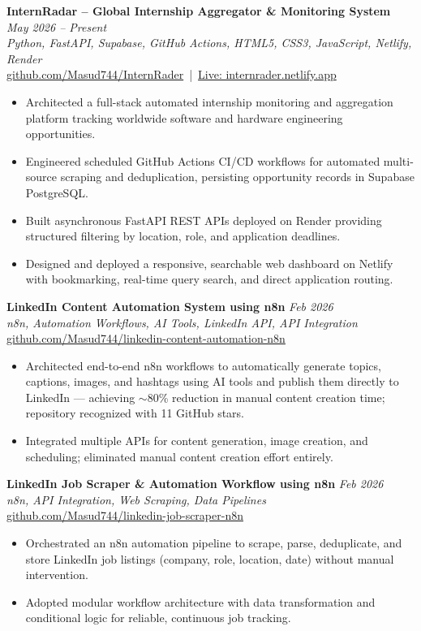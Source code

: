 \documentclass[11pt,a4paper]{article}
\begin{document}
\textbf{InternRadar -- Global Internship Aggregator \& Monitoring System} \hfill \textit{May 2026 -- Present} \\
\textit{Python, FastAPI, Supabase, GitHub Actions, HTML5, CSS3, JavaScript, Netlify, Render} \\
\href{https://github.com/Masud744/InternRader}{github.com/Masud744/InternRader} \,|\, \href{https://internrader.netlify.app/}{Live: internrader.netlify.app}
\begin{itemize}
    \item Architected a full-stack automated internship monitoring and aggregation platform tracking worldwide software and hardware engineering opportunities.
    \item Engineered scheduled GitHub Actions CI/CD workflows for automated multi-source scraping and deduplication, persisting opportunity records in Supabase PostgreSQL.
    \item Built asynchronous FastAPI REST APIs deployed on Render providing structured filtering by location, role, and application deadlines.
    \item Designed and deployed a responsive, searchable web dashboard on Netlify with bookmarking, real-time query search, and direct application routing.
\end{itemize}


\textbf{LinkedIn Content Automation System using n8n} \hfill \textit{Feb 2026} \\
\textit{n8n, Automation Workflows, AI Tools, LinkedIn API, API Integration} \\
\href{https://github.com/Masud744/linkedin-content-automation-n8n}{github.com/Masud744/linkedin-content-automation-n8n}
\begin{itemize}
    \item Architected end-to-end n8n workflows to automatically generate topics, captions, images, and hashtags using AI tools and publish them directly to LinkedIn --- achieving $\sim$80\% reduction in manual content creation time; repository recognized with 11 GitHub stars.
    \item Integrated multiple APIs for content generation, image creation, and scheduling; eliminated manual content creation effort entirely.
\end{itemize}

\textbf{LinkedIn Job Scraper \& Automation Workflow using n8n} \hfill \textit{Feb 2026} \\
\textit{n8n, API Integration, Web Scraping, Data Pipelines} \\
\href{https://github.com/Masud744/linkedin-job-scraper-n8n}{github.com/Masud744/linkedin-job-scraper-n8n}
\begin{itemize}
    \item Orchestrated an n8n automation pipeline to scrape, parse, deduplicate, and store LinkedIn job listings (company, role, location, date) without manual intervention.
    \item Adopted modular workflow architecture with data transformation and conditional logic for reliable, continuous job tracking.
\end{itemize}
\end{document}
